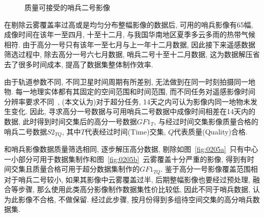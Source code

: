 \begin{figure}[!htbp]
    \centering
    \quad
    \caption{质量可接受的哨兵二号影像}
    \label{fig:0204}
\end{figure}

在剔除云雾覆盖率过高或是均匀分布整幅影像的数据后, 可用的哨兵影像有65幅, 成像时间在该年一至四月, 十至十二月, 与我国华南地区夏季多云多雨的热带气候相符. 由于高分一号只有该年一至七月与上一年十二月数据, 因此接下来遥感数据筛选过程中, 除去高分一号六七月数据, 哨兵二号十至十二月数据, 这为数据解压省去了很多时间成本, 提高了数据集整体制作效率.

由于轨道参数不同, 不同卫星时间周期有所差别, 无法做到在同一时刻拍摄同一地物. 每一地理实体都有其固定的空间范围和时间范围, 而不同任务对遥感影像时间分辨率要求不同~\cite{day14paper}, (本文认为)对于超分任务, 14天之内可认为影像内同一地物未发生变化. 因此, 寻求高分一号数据与可用哨兵二号数据中成像时间相差在14天内的数据, 此时得到时间交集后的高分一号数据$GF1_{T}$, 与经过时间交集影像质量合格的哨兵二号数据$S2_{TQ}$, 其中$T$代表经过时间(Time)交集, $Q$代表质量(Quality)合格.

和哨兵影像数据质量筛选相同, 逐步解压高分数据, 剔除如图~\ref{fig:0205a}~只有中心一小部分可用于数据集制作和图~\ref{fig:0205b}~云雾覆盖十分严重的影像, 得到有时间交集且质量合格可用于超分数据集制作的$GF1_{TQ}$. 鉴于高分一号影像覆盖范围相对于哨兵二号较小, 如果其影像中云雾覆盖过半, 后期整幅影像也要经过预处理, 融合等步骤, 那么使用此类高分影像制作数据集性价比较低, 因此不同于哨兵数据, 认为此影像不合格, 不做保留. 经过此步骤, 按月份得到多组待空间交集的高分哨兵数据集.

